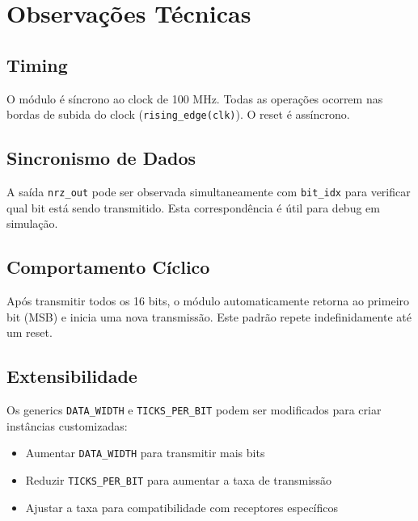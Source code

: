 \documentclass[11pt,a4paper]{article}
\begin{document}
\newpage
\section{Observações Técnicas}

\subsection{Timing}

O módulo é síncrono ao clock de 100 MHz. Todas as operações ocorrem nas bordas de subida do clock (\texttt{rising\_edge(clk)}). O reset é assíncrono.

\subsection{Sincronismo de Dados}

A saída \texttt{nrz\_out} pode ser observada simultaneamente com \texttt{bit\_idx} para verificar qual bit está sendo transmitido. Esta correspondência é útil para debug em simulação.

\subsection{Comportamento Cíclico}

Após transmitir todos os 16 bits, o módulo automaticamente retorna ao primeiro bit (MSB) e inicia uma nova transmissão. Este padrão repete indefinidamente até um reset.

\subsection{Extensibilidade}

Os generics \texttt{DATA\_WIDTH} e \texttt{TICKS\_PER\_BIT} podem ser modificados para criar instâncias customizadas:

\begin{itemize}
    \item Aumentar \texttt{DATA\_WIDTH} para transmitir mais bits
    \item Reduzir \texttt{TICKS\_PER\_BIT} para aumentar a taxa de transmissão
    \item Ajustar a taxa para compatibilidade com receptores específicos
\end{itemize}
\end{document}
